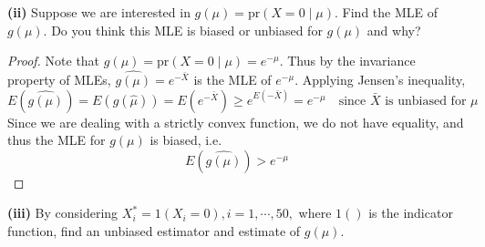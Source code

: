 \documentclass[letterpaper, 12pt]{article}\usepackage[]{graphicx}\usepackage[]{color}
\newcommand{\pr}{\text{pr}}
\newcommand{\sbs}{\;|\;} %
\begin{document}
\textbf{(ii)}
Suppose we are interested in $g(\mu) = \pr(X=0 \sbs \mu)$. Find the MLE of $g(\mu)$. Do you think this MLE is biased or unbiased for $g(\mu)$ and why?
\begin{proof}
Note that $g(\mu) = \pr(X=0 \sbs \mu) = e^{-\mu}$. Thus by the invariance property of MLEs, $\widehat{g(\mu)} = e^{-\bar{X}}$ is the MLE of $e^{-\mu}$. Applying Jensen's inequality, 
\begin{equation*}
E(\widehat{g(\mu)}) 
=
E(g(\hat{\mu})) 
= 
E (e ^{- \bar{X}}) 
\geq 
e^{E(-\bar{X})} 
= e^{-\mu}
\quad \text{since $\bar{X}$ is unbiased for $\mu$}
\end{equation*}
Since we are dealing with a strictly convex function, we do not have equality, and thus the MLE for $g(\mu)$ is biased, i.e.
\[
E(\widehat{g(\mu)}) > e^{-\mu}
\]
\end{proof}
\textbf{(iii)}
By considering $X_i^* = 1 (X_i = 0), i = 1, \cdots, 50,$ where $1()$ is the indicator function, find an unbiased estimator and estimate of $g(\mu)$.
\end{document}
